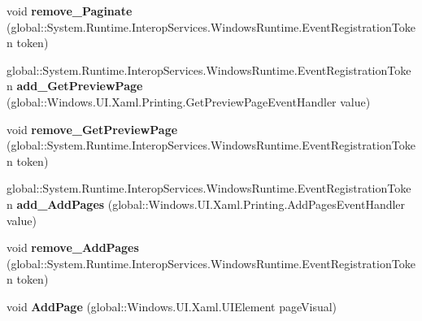 \begin{DoxyCompactItemize}
void {\bfseries remove\+\_\+\+Paginate} (global\+::\+System.\+Runtime.\+Interop\+Services.\+Windows\+Runtime.\+Event\+Registration\+Token token)
\item 
\mbox{\label{interface_windows_1_1_u_i_1_1_xaml_1_1_printing_1_1_i_print_document_acb9d671a3b4a58e885771c4ec6c329d5}} 
global\+::\+System.\+Runtime.\+Interop\+Services.\+Windows\+Runtime.\+Event\+Registration\+Token {\bfseries add\+\_\+\+Get\+Preview\+Page} (global\+::\+Windows.\+U\+I.\+Xaml.\+Printing.\+Get\+Preview\+Page\+Event\+Handler value)
\item 
\mbox{\label{interface_windows_1_1_u_i_1_1_xaml_1_1_printing_1_1_i_print_document_aa975f5387eb09201d39628055f1bfb7d}} 
void {\bfseries remove\+\_\+\+Get\+Preview\+Page} (global\+::\+System.\+Runtime.\+Interop\+Services.\+Windows\+Runtime.\+Event\+Registration\+Token token)
\item 
\mbox{\label{interface_windows_1_1_u_i_1_1_xaml_1_1_printing_1_1_i_print_document_a6a0ff286beb8ddcdbe12d51a49010b97}} 
global\+::\+System.\+Runtime.\+Interop\+Services.\+Windows\+Runtime.\+Event\+Registration\+Token {\bfseries add\+\_\+\+Add\+Pages} (global\+::\+Windows.\+U\+I.\+Xaml.\+Printing.\+Add\+Pages\+Event\+Handler value)
\item 
\mbox{\label{interface_windows_1_1_u_i_1_1_xaml_1_1_printing_1_1_i_print_document_a78e46b68309d6b34dfdab7f6631761a6}} 
void {\bfseries remove\+\_\+\+Add\+Pages} (global\+::\+System.\+Runtime.\+Interop\+Services.\+Windows\+Runtime.\+Event\+Registration\+Token token)
\item 
\mbox{\label{interface_windows_1_1_u_i_1_1_xaml_1_1_printing_1_1_i_print_document_ade20244bcf646d2b02009597f231a389}} 
void {\bfseries Add\+Page} (global\+::\+Windows.\+U\+I.\+Xaml.\+U\+I\+Element page\+Visual)
\item 
\mbox{\label{interface_windows_1_1_u_i_1_1_xaml_1_1_printing_1_1_i_print_document_afd3c80952164c742e794be2817c23c65}} 

\end{DoxyCompactItemize}
